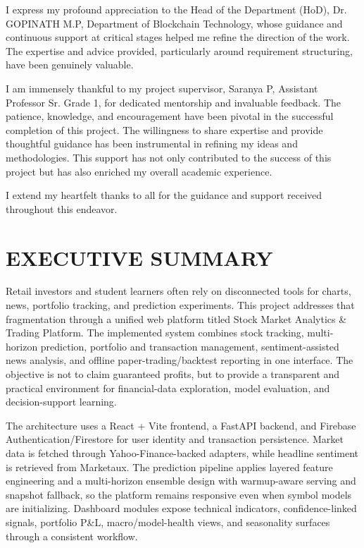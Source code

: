 \documentclass[12pt,a4paper]{report}
\numberwithin{equation}{chapter}
\begin{document}
I express my profound appreciation to the Head of the Department (HoD), Dr. GOPINATH M.P, Department of Blockchain Technology, whose guidance and continuous support at critical stages helped me refine the direction of the work. The expertise and advice provided, particularly around requirement structuring, have been genuinely valuable.

I am immensely thankful to my project supervisor, Saranya P, Assistant Professor Sr. Grade 1, for dedicated mentorship and invaluable feedback. The patience, knowledge, and encouragement have been pivotal in the successful completion of this project. The willingness to share expertise and provide thoughtful guidance has been instrumental in refining my ideas and methodologies. This support has not only contributed to the success of this project but has also enriched my overall academic experience.

I extend my heartfelt thanks to all for the guidance and support received throughout this endeavor.

\chapter*{EXECUTIVE SUMMARY}

Retail investors and student learners often rely on disconnected tools for charts, news, portfolio tracking, and prediction experiments. This project addresses that fragmentation through a unified web platform titled Stock Market Analytics \& Trading Platform. The implemented system combines stock tracking, multi-horizon prediction, portfolio and transaction management, sentiment-assisted news analysis, and offline paper-trading/backtest reporting in one interface. The objective is not to claim guaranteed profits, but to provide a transparent and practical environment for financial-data exploration, model evaluation, and decision-support learning.

The architecture uses a React + Vite frontend, a FastAPI backend, and Firebase Authentication/Firestore for user identity and transaction persistence. Market data is fetched through Yahoo-Finance-backed adapters, while headline sentiment is retrieved from Marketaux. The prediction pipeline applies layered feature engineering and a multi-horizon ensemble design with warmup-aware serving and snapshot fallback, so the platform remains responsive even when symbol models are initializing. Dashboard modules expose technical indicators, confidence-linked signals, portfolio P\&L, macro/model-health views, and seasonality surfaces through a consistent workflow.
\end{document}
